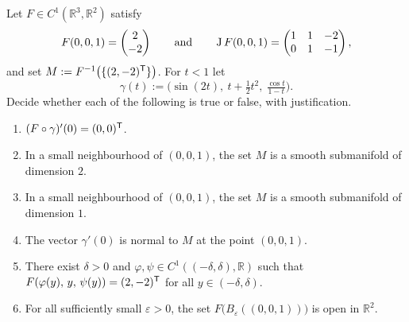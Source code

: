 \begin{exercise}
\label{ex:level_set_of_a_wide_jacobian}
Let $F \in C^1(\mathbb{R}^3,\mathbb{R}^2)$ satisfy
\[F(0,0,1) = \begin{pmatrix} 2 \\ -2\end{pmatrix} \qquad\text{and}\qquad
  \operatorname{J} F(0,0,1) = \begin{pmatrix} 1 & 1 & -2 \\ 0 & 1 & -1\end{pmatrix},\]
and set $M := F^{-1}\big(\{(2,-2)^{\mathsf{T}}\}\big)$. For $t < 1$ let
\[\gamma(t) := \Big(\sin(2t),\ t+\tfrac12t^2,\ \tfrac{\cos t}{1-t}\Big).\]
Decide whether each of the following is true or false, with justification.
\begin{enumerate}[label=\textbf{(\alph*)}]
  \item $(F\circ\gamma)'(0) = (0,0)^{\mathsf{T}}$.
  \item In a small neighbourhood of $(0,0,1)$, the set $M$ is a smooth submanifold of
    dimension $2$.
  \item In a small neighbourhood of $(0,0,1)$, the set $M$ is a smooth submanifold of
    dimension $1$.
  \item The vector $\gamma'(0)$ is normal to $M$ at the point $(0,0,1)$.
  \item There exist $\delta > 0$ and $\varphi,\psi \in C^1((-\delta,\delta),\mathbb{R})$ such
    that $F(\varphi(y),\,y,\,\psi(y)) = (2,-2)^{\mathsf{T}}$ for all $y \in (-\delta,\delta)$.
  \item For all sufficiently small $\varepsilon > 0$, the set
    $F\big(B_\varepsilon((0,0,1))\big)$ is open in $\mathbb{R}^2$.
\end{enumerate}
\end{exercise}

